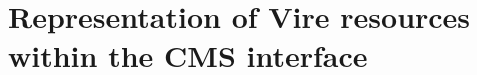 
\section{Representation of Vire resources within the CMS interface}
\label{sec:vire_resources}









